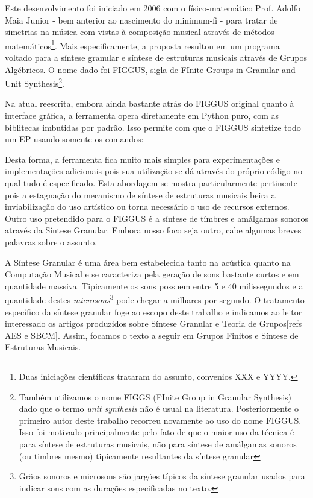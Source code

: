 Este desenvolvimento foi iniciado em 2006 com o físico-matemático Prof. Adolfo Maia Junior - bem anterior
ao nascimento do minimum-fi - para
tratar de simetrias na música com vistas à composição musical através
de métodos matemáticos\footnote{Duas iniciações científicas trataram do assunto, convenios XXX e YYYY.}. Mais especificamente, a proposta resultou em
um programa voltado para a síntese
granular e síntese de estruturas musicais através de Grupos Algébricos. O nome dado
foi FIGGUS, sigla de FInite Groups in Granular and Unit Synthesis\footnote{Também utilizamos
o nome FIGGS (FInite Group in Granular Synthesis) dado que o termo \emph{unit synthesis} não
é usual na literatura. Posteriormente o primeiro autor deste trabalho recorreu novamente
ao uso do nome FIGGUS. Isso foi motivado principalmente pelo fato de que
o maior uso da técnica é para síntese de estruturas musicais, não para
síntese de amálgamas sonoros (ou timbres mesmo) tipicamente resultantes da síntese granular}.

Na atual reescrita, embora ainda bastante atrás do FIGGUS original quanto
à interface gráfica, a ferramenta opera diretamente em Python puro,
com as biblitecas imbutidas por padrão. Isso permite com que o FIGGUS
sintetize todo um EP usando somente os comandos:


Desta forma, a ferramenta fica muito mais simples para experimentações
e implementações adicionais pois sua utilização se dá através
do próprio código no qual tudo é especificado. Esta abordagem se mostra particularmente
pertinente pois a estagnação do mecanismo de síntese de estruturas musicais
beira a inviabilização do uso artístico ou torna necessário o uso
de recursos externos.
Outro uso pretendido para o FIGGUS
é a síntese de tímbres e amálgamas sonoros através da
Síntese Granular. Embora nosso foco seja outro, cabe algumas breves
palavras sobre o assunto.

A Síntese Granular é uma área bem estabelecida tanto na acústica quanto
na Computação Musical e se caracteriza pela geração de sons bastante curtos
e em quantidade massiva. Tipicamente os sons possuem entre 5 e 40 milissegundos
e a quantidade destes \emph{microsons}\footnote{Grãos sonoros e microsons são jargões
típicos da síntese granular usados para indicar sons com as durações especificadas
no texto.} pode chegar a milhares por segundo. O tratamento específico da
síntese granular foge ao escopo deste trabalho e indicamos ao leitor interessado
os artigos produzidos sobre Síntese Granular e Teoria de Grupos[refs AES e SBCM].
Assim, focamos o texto a seguir em Grupos Finitos e Síntese de Estruturas Musicais.


